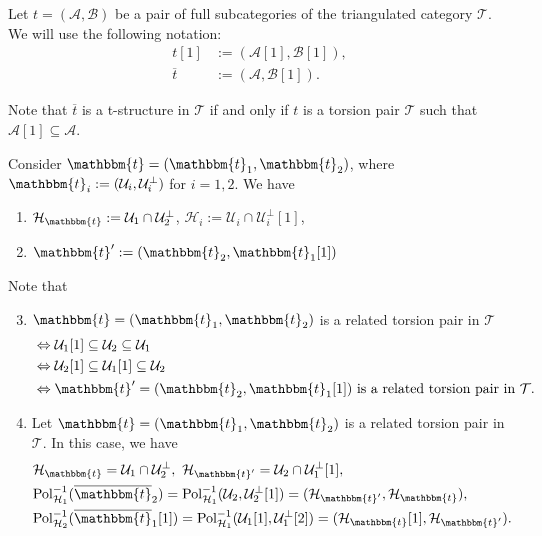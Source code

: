 Let $t=(\mathcal{A},\mathcal{B})$ be a pair of full subcategories of the triangulated
category $\mathcal{T}$. We will use the following notation:
\begin{align*}
  t[1] &:= (\mathcal{A}[1],\mathcal{B}[1]),\\
  \overline{t} &:= (\mathcal{A},\mathcal{B}[1]).
\end{align*}

Note that $\overline{t}$ is a t-structure in $\mathcal{T}$ if and only if $t$ is a torsion
pair $\mathcal{T}$ such that $\mathcal{A}[1]\subseteq\mathcal{A}$.

\begin{rmk}
  Consider $\mathbbm{t}=(\mathbbm{t}_1,\mathbbm{t}_2)$, where $\mathbbm{t}_i:=(\mathcal{U}_i,\mathcal{U}_i^\perp)$ for
  $i=1,2$. We have
  \begin{enumerate}
    \item $\mathcal{H}_\mathbbm{t}:=\mathcal{U}_1\cap\mathcal{U}_2^\perp$,
      $\mathcal{H}_i:=\mathcal{U}_i\cap\mathcal{U}_i^\perp[1]$,
    \item $\mathbbm{t}' :=(\mathbbm{t}_2,\mathbbm{t}_1[1])$
  \end{enumerate}

  Note that
  \begin{enumerate}
    \setcounter{enumi}{2}
    \item $\mathbbm{t}=(\mathbbm{t}_1,\mathbbm{t}_2)$ is a related torsion pair in $\mathcal{T}$
      \begin{align*}
        &\Leftrightarrow \mathcal{U}_1[1]\subseteq\mathcal{U}_2\subseteq\mathcal{U}_1\\
        &\Leftrightarrow \mathcal{U}_2[1]\subseteq\mathcal{U}_1[1]\subseteq\mathcal{U}_2\\
        &\Leftrightarrow \mathbbm{t}'=(\mathbbm{t}_2,\mathbbm{t}_1[1]) \text{ is a related torsion pair in }\mathcal{T}.
      \end{align*}
    \item Let $\mathbbm{t}=(\mathbbm{t}_1,\mathbbm{t}_2)$ is a related torsion pair in $\mathcal{T}$. In
      this case, we have
      \begin{align*}
        &\mathcal{H}_\mathbbm{t} = \mathcal{U}_1\cap\mathcal{U}_2^\perp,~
        \mathcal{H}_{\mathbbm{t}'}=\mathcal{U}_2\cap \mathcal{U}_1^\perp[1],\\
        & \mathrm{Pol}_{\mathcal{H}_1}^{-1}(\overline{\mathbbm{t}}_2)=
        \mathrm{Pol}_{\mathcal{H}_1}^{-1}(\mathcal{U}_2,\mathcal{U}_2^\perp[1])=
        (\mathcal{H}_{\mathbbm{t}'},\mathcal{H}_{\mathbbm{t}}),\\
        &\mathrm{Pol}_{\mathcal{H}_2}^{-1}(\overline{\mathbbm{t}}_1[1])=
        \mathrm{Pol}_{\mathcal{H}_1}^{-1}(\mathcal{U}_1[1],\mathcal{U}_1^\perp[2])=
        (\mathcal{H}_{\mathbbm{t}}[1],\mathcal{H}_{\mathbbm{t}'}).
      \end{align*}


\end{enumerate}
\end{rmk}
